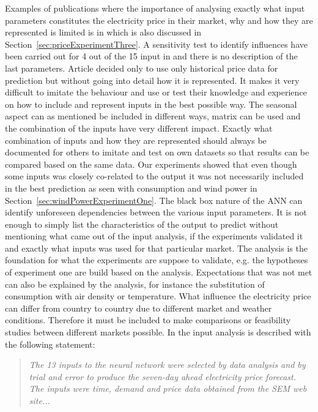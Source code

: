 Examples of publications where the importance of analysing exactly what input parameters constitutes the electricity price in their market, why and how they are represented is limited is in\cite{szkuta1999electricity,sansom1999neural,1} which is also discussed in Section~\ref{sec:priceExperimentThree}. A sensitivity test to identify influences have been carried out for 4 out of the 15 input in \cite{szkuta1999electricity} and there is no description of the last parameters. Article \cite{1} decided only to use only historical price data for prediction but without going into detail how it is represented. It makes it very difficult to imitate the behaviour and use or test their knowledge and experience on how to include and represent inputs in the best possible way. The seasonal aspect can as mentioned be included in different ways, matrix can be used and the combination of the inputs have very different impact. Exactly what combination of inputs and how they are represented should always be documented for others to imitate and test on own datasets so that results can be compared based on the same data. Our experiments showed that even though some inputs was closely co-related to the output it was not necessarily included in the best prediction as seen with consumption and wind power in Section~\ref{sec:windPowerExperimentOne}. The black box nature of the ANN can identify unforeseen dependencies between the various input parameters. It is not enough to simply list the characteristics of the output to predict without mentioning what came out of the input analysis, if the experiments validated it and exactly what inputs was used for that particular market. The analysis is the foundation for what the experiments are suppose to validate, e.g. the hypotheses of experiment one are build based on the analysis. Expectations that was not met can also be explained by the analysis, for instance the substitution of consumption with air density or temperature. What influence the electricity price can differ from country to country due to different market and weather conditions. Therefore it must be included to make comparisons or feasibility studies between different markets possible. In \cite{sansom1999neural} the input analysis is described with the following statement:

\begin{quotation}
\textit{The 13 inputs to the neural network were selected by data analysis and by trial and error to produce the seven-day ahead electricity price forecast. The inputs were time, demand and price data obtained from the SEM web site...}
\end{quotation}


